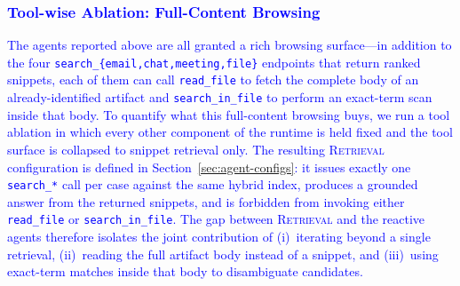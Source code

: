 \subsubsection{\textcolor{blue}{Tool-wise Ablation: Full-Content Browsing}}
\label{sec:ablation-tool}
\textcolor{blue}{The agents reported above are all granted a rich browsing surface---in addition to the four \texttt{search\_\{email,chat,meeting,file\}} endpoints that return ranked snippets, each of them can call \texttt{read\_file} to fetch the complete body of an already-identified artifact and \texttt{search\_in\_file} to perform an exact-term scan inside that body. To quantify what this full-content browsing buys, we run a tool ablation in which every other component of the runtime is held fixed and the tool surface is collapsed to snippet retrieval only. The resulting \textsc{Retrieval} configuration is defined in Section~\ref{sec:agent-configs}: it issues exactly one \texttt{search\_*} call per case against the same hybrid index, produces a grounded answer from the returned snippets, and is forbidden from invoking either \texttt{read\_file} or \texttt{search\_in\_file}. The gap between \textsc{Retrieval} and the reactive agents therefore isolates the joint contribution of (i)~iterating beyond a single retrieval, (ii)~reading the full artifact body instead of a snippet, and (iii)~using exact-term matches inside that body to disambiguate candidates.}


